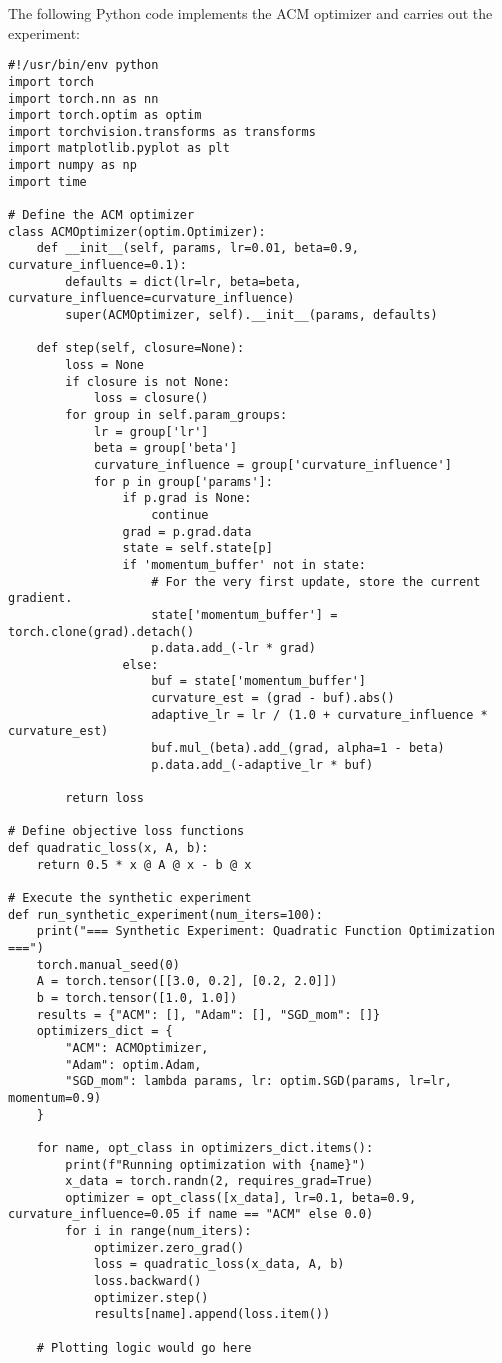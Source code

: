 \documentclass{article} %
\begin{document}
The following Python code implements the ACM optimizer and carries out the experiment:
\begin{verbatim}
#!/usr/bin/env python
import torch
import torch.nn as nn
import torch.optim as optim
import torchvision.transforms as transforms
import matplotlib.pyplot as plt
import numpy as np
import time

# Define the ACM optimizer
class ACMOptimizer(optim.Optimizer):
    def __init__(self, params, lr=0.01, beta=0.9, curvature_influence=0.1):
        defaults = dict(lr=lr, beta=beta, curvature_influence=curvature_influence)
        super(ACMOptimizer, self).__init__(params, defaults)

    def step(self, closure=None):
        loss = None
        if closure is not None:
            loss = closure()
        for group in self.param_groups:
            lr = group['lr']
            beta = group['beta']
            curvature_influence = group['curvature_influence']
            for p in group['params']:
                if p.grad is None:
                    continue
                grad = p.grad.data
                state = self.state[p]
                if 'momentum_buffer' not in state:
                    # For the very first update, store the current gradient.
                    state['momentum_buffer'] = torch.clone(grad).detach()
                    p.data.add_(-lr * grad)
                else:
                    buf = state['momentum_buffer']
                    curvature_est = (grad - buf).abs()
                    adaptive_lr = lr / (1.0 + curvature_influence * curvature_est)
                    buf.mul_(beta).add_(grad, alpha=1 - beta)
                    p.data.add_(-adaptive_lr * buf)

        return loss

# Define objective loss functions
def quadratic_loss(x, A, b):
    return 0.5 * x @ A @ x - b @ x

# Execute the synthetic experiment
def run_synthetic_experiment(num_iters=100):
    print("=== Synthetic Experiment: Quadratic Function Optimization ===")
    torch.manual_seed(0)
    A = torch.tensor([[3.0, 0.2], [0.2, 2.0]])
    b = torch.tensor([1.0, 1.0])
    results = {"ACM": [], "Adam": [], "SGD_mom": []}
    optimizers_dict = {
        "ACM": ACMOptimizer,
        "Adam": optim.Adam,
        "SGD_mom": lambda params, lr: optim.SGD(params, lr=lr, momentum=0.9)
    }

    for name, opt_class in optimizers_dict.items():
        print(f"Running optimization with {name}")
        x_data = torch.randn(2, requires_grad=True)
        optimizer = opt_class([x_data], lr=0.1, beta=0.9, curvature_influence=0.05 if name == "ACM" else 0.0)
        for i in range(num_iters):
            optimizer.zero_grad()
            loss = quadratic_loss(x_data, A, b)
            loss.backward()
            optimizer.step()
            results[name].append(loss.item())

    # Plotting logic would go here
\end{verbatim}
\end{document}
